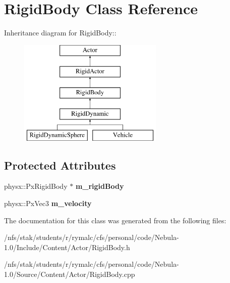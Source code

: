 \hypertarget{classRigidBody}{
\section{RigidBody Class Reference}
\label{classRigidBody}
}
Inheritance diagram for RigidBody::\begin{figure}[H]
\begin{center}
\leavevmode
\includegraphics[height=5cm]{classRigidBody}
\end{center}
\end{figure}
\subsection*{Protected Attributes}
\begin{DoxyCompactItemize}
\item 
\hypertarget{classRigidBody_a5582d791a3aec6da14894809cb624567}{
physx::PxRigidBody $\ast$ {\bfseries m\_\-rigidBody}}
\label{classRigidBody_a5582d791a3aec6da14894809cb624567}

\item 
\hypertarget{classRigidBody_a83407ceb81169cf62a31de2527df8226}{
physx::PxVec3 {\bfseries m\_\-velocity}}
\label{classRigidBody_a83407ceb81169cf62a31de2527df8226}

\end{DoxyCompactItemize}


The documentation for this class was generated from the following files:\begin{DoxyCompactItemize}
\item 
/nfs/stak/students/r/rymalc/cfs/personal/code/Nebula-\/1.0/Include/Content/Actor/RigidBody.h\item 
/nfs/stak/students/r/rymalc/cfs/personal/code/Nebula-\/1.0/Source/Content/Actor/RigidBody.cpp\end{DoxyCompactItemize}
